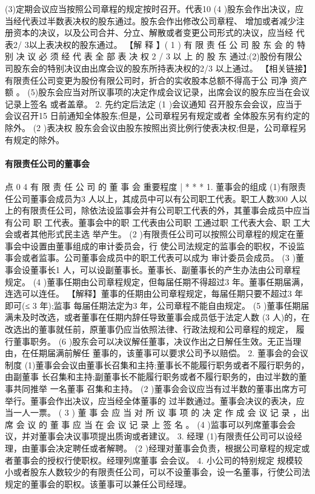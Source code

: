 \documentclass[UTF8,12pt]{ctexart}
\numberwithin{equation}{section} %
\numberwithin{figure}{section}
\numberwithin{table}{section}
\begin{document}
	(3)定期会议应当按照公司章程的规定按时召开。代表10%
	(4 )股东会作出决议，应当经代表过半数表决权的股东通过。股东会作出修改公司章程、 增加或者减少注册资本的决议，以及公司合并、分立、解散或者变更公司形式的决议，应当经 代表2/ 3以上表决权的股东通过。
	【解 释 】( 1 ) 有 限 责 任 公 司 股 东 会 的 特 别 决 议 必 须 经 代 表 全 部 表 决 权 2 / 3 以 上 的 股 东 通过;(2)股份有限公司股东会的特别决议由出席会议的股东所持表决权的2/3 以上通过。
	【相关链接】有限责任公司变更为股份有限公司时，折合的实收股本总额不得高于公 司净 资产额 。
	(5)股东会应当对所议事项的决定作成会议记录，出席会议的股东应当在会议记录上签名 或者盖章。
	2. 先约定后法定
	(1 )会议通知
	召开股东会会议，应当于会议召开15 日前通知全体股东;但是，公司章程另有规定或者 全体股东另有约定的除外。
	(2 )表决权 股东会会议由股东按照出资比例行使表决权;但是，公司章程另有规定的除外。
	
	\paragraph{有限责任公司的董事会}
	
	 点 0 4 有 限 责 任 公 司 的 董 事 会 重要程度 | * * *
	1. 董事会的组成
	(1)有限责任公司董事会成员为3 人以上，其成员中可以有公司职工代表。职工人数300 人以上的有限责任公司，除依法设监事会并有公司职工代表的外，其董事会成员中应当有公司 职 工代表。董事会中的职 工代表由公司职 工通过职 工代表大会、职 工大会或者其他形式民主选 举产生。
	(2 )有限责任公司可以按照公司章程的规定在董事会中设置由董事组成的审计委员会，行 使公司法规定的监事会的职权，不设监事会或者监事。公司董事会成员中的职工代表可以成为 审计委员会成员。
	(3 )董事会设董事长1 人，可以设副董事长。董事长、副董事长的产生办法由公司章程 规定。
	(4 )董事任期由公司章程规定，但每届任期不得超过3 年。董事任期届满，连选可以连任。 【解释】董事的任期由公司章程规定，每届任期只要不超过3 年即可(≤ 3 年);监事 每届任期法定为3 年，公司章程不能自由规定。
	(5 )董事任期届满未及时改选，或者董事在任期内辞任导致董事会成员低于法定人数 (3 人)的，在改选出的董事就任前，原董事仍应当依照法律、行政法规和公司章程的规定， 履行董事职务。
	(6 )股东会可以决议解任董事，决议作出之日解任生效。无正当理由，在任期届满前解任 董事的，该董事可以要求公司予以赔偿。
	2. 董事会的会议制度 (1)董事会会议由董事长召集和主持;董事长不能履行职务或者不履行职务的，由副董事 长召集和主持;副董事长不能履行职务或者不履行职务的，由过半数的董事共同推举 一名董事 召集和主持。
	(2 )董事会会议应当有过半数的董事出席方可举行。董事会作出决议，应当经全体董事的 过半数通过。董事会决议的表决，应当一人一票。
	( 3 ) 董 事 会 应 当 对 所 议 事 项 的 决 定 作 成 会 议 记 录 ，出 席 会 议 的 董 事 应 当 在 会 议 记 录 上 签 名 。 (4 )监事可以列席董事会会议，并对董事会决议事项提出质询或者建议。
	3. 经理
	(1)有限责任公司可以设经理，由董事会决定聘任或者解聘。
	(2 )经理对董事会负责，根据公司章程的规定或者董事会的授权行使职权。经理列席董事 会会议。
	4. 小公司的特别规定 规模较小或者股东人数较少的有限责任公司，可以不设董事会，设一名董事，行使公司法 规定的董事会的职权。该董事可以兼任公司经理。
	
\end{document}
